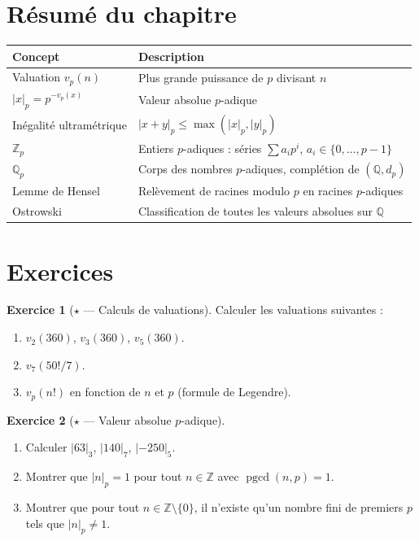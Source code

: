\documentclass[12pt,a4paper,openany]{book}
\theoremstyle{definition}
\newtheorem{exercice}{Exercice}[chapter]
\theoremstyle{plain}
\theoremstyle{remark}
\newcommand{\Z}{\mathbb{Z}}
\newcommand{\Q}{\mathbb{Q}}
\newcommand{\abs}[1]{\left|#1\right|}
\DeclareMathOperator{\pgcd}{pgcd}
\begin{document}
\section{Résumé du chapitre}
\label{sec:resume-ch9}

\begin{center}
\begin{tabular}{lp{9cm}}
\toprule
\textbf{Concept} & \textbf{Description} \\
\midrule
Valuation $v_p(n)$ & Plus grande puissance de $p$ divisant $n$ \\
$\abs{x}_p = p^{-v_p(x)}$ & Valeur absolue $p$-adique \\
Inégalité ultramétrique & $\abs{x+y}_p \leq \max(\abs{x}_p, \abs{y}_p)$ \\
$\Z_p$ & Entiers $p$-adiques : séries $\sum a_i p^i$, $a_i \in \{0,\ldots,p-1\}$ \\
$\Q_p$ & Corps des nombres $p$-adiques, complétion de $(\Q, d_p)$ \\
Lemme de Hensel & Relèvement de racines modulo $p$ en racines $p$-adiques \\
Ostrowski & Classification de toutes les valeurs absolues sur $\Q$ \\
\bottomrule
\end{tabular}
\end{center}

\section{Exercices}
\label{sec:exercices-ch9}

\begin{exercice}[$\star$ --- Calculs de valuations]
\label{exo:calculs-valuations}
Calculer les valuations suivantes :
\begin{enumerate}[label=(\alph*)]
  \item $v_2(360)$, $v_3(360)$, $v_5(360)$.
  \item $v_7(50!/7)$.
  \item $v_p(n!)$ en fonction de $n$ et $p$ (formule de Legendre).
\end{enumerate}
\end{exercice}

\begin{exercice}[$\star$ --- Valeur absolue $p$-adique]
\label{exo:valeur-absolue-p-adique}
\begin{enumerate}[label=(\alph*)]
  \item Calculer $\abs{63}_3$, $\abs{140}_7$, $\abs{-250}_5$.
  \item Montrer que $\abs{n}_p = 1$ pour tout $n \in \Z$ avec $\pgcd(n,p)=1$.
  \item Montrer que pour tout $n \in \Z \setminus \{0\}$, il n'existe qu'un nombre
    fini de premiers $p$ tels que $\abs{n}_p \neq 1$.
\end{enumerate}
\end{exercice}
\end{document}
